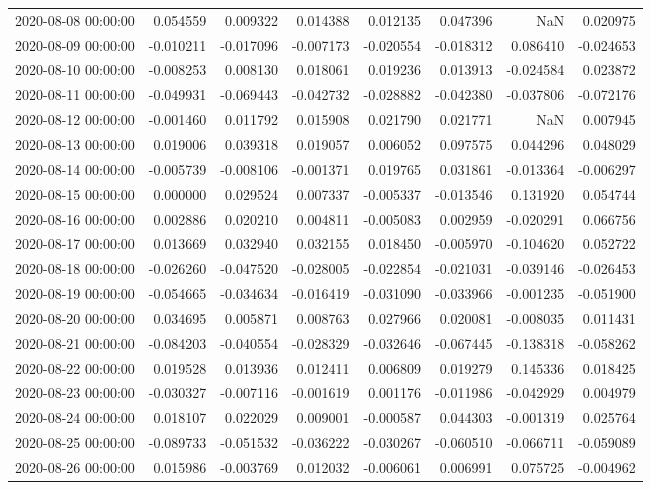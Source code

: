 \begin{tabular}{lrrrrrrr}
2020-08-08 00:00:00 & 0.054559 & 0.009322 & 0.014388 & 0.012135 & 0.047396 & NaN & 0.020975 \\
2020-08-09 00:00:00 & -0.010211 & -0.017096 & -0.007173 & -0.020554 & -0.018312 & 0.086410 & -0.024653 \\
2020-08-10 00:00:00 & -0.008253 & 0.008130 & 0.018061 & 0.019236 & 0.013913 & -0.024584 & 0.023872 \\
2020-08-11 00:00:00 & -0.049931 & -0.069443 & -0.042732 & -0.028882 & -0.042380 & -0.037806 & -0.072176 \\
2020-08-12 00:00:00 & -0.001460 & 0.011792 & 0.015908 & 0.021790 & 0.021771 & NaN & 0.007945 \\
2020-08-13 00:00:00 & 0.019006 & 0.039318 & 0.019057 & 0.006052 & 0.097575 & 0.044296 & 0.048029 \\
2020-08-14 00:00:00 & -0.005739 & -0.008106 & -0.001371 & 0.019765 & 0.031861 & -0.013364 & -0.006297 \\
2020-08-15 00:00:00 & 0.000000 & 0.029524 & 0.007337 & -0.005337 & -0.013546 & 0.131920 & 0.054744 \\
2020-08-16 00:00:00 & 0.002886 & 0.020210 & 0.004811 & -0.005083 & 0.002959 & -0.020291 & 0.066756 \\
2020-08-17 00:00:00 & 0.013669 & 0.032940 & 0.032155 & 0.018450 & -0.005970 & -0.104620 & 0.052722 \\
2020-08-18 00:00:00 & -0.026260 & -0.047520 & -0.028005 & -0.022854 & -0.021031 & -0.039146 & -0.026453 \\
2020-08-19 00:00:00 & -0.054665 & -0.034634 & -0.016419 & -0.031090 & -0.033966 & -0.001235 & -0.051900 \\
2020-08-20 00:00:00 & 0.034695 & 0.005871 & 0.008763 & 0.027966 & 0.020081 & -0.008035 & 0.011431 \\
2020-08-21 00:00:00 & -0.084203 & -0.040554 & -0.028329 & -0.032646 & -0.067445 & -0.138318 & -0.058262 \\
2020-08-22 00:00:00 & 0.019528 & 0.013936 & 0.012411 & 0.006809 & 0.019279 & 0.145336 & 0.018425 \\
2020-08-23 00:00:00 & -0.030327 & -0.007116 & -0.001619 & 0.001176 & -0.011986 & -0.042929 & 0.004979 \\
2020-08-24 00:00:00 & 0.018107 & 0.022029 & 0.009001 & -0.000587 & 0.044303 & -0.001319 & 0.025764 \\
2020-08-25 00:00:00 & -0.089733 & -0.051532 & -0.036222 & -0.030267 & -0.060510 & -0.066711 & -0.059089 \\
2020-08-26 00:00:00 & 0.015986 & -0.003769 & 0.012032 & -0.006061 & 0.006991 & 0.075725 & -0.004962 \\

\end{tabular}

